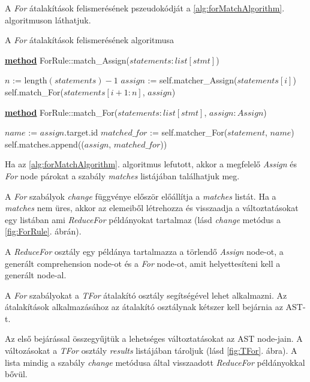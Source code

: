 A \emph{For} átalakítások felismerésének pszeudokódját a
\ref{alg:forMatchAlgorithm}. algoritmuson láthatjuk.

\begin{algorithm}[H]
	\caption{A \emph{For} átalakítások felismerésének algoritmusa}
	\label{alg:forMatchAlgorithm}
	\textbf{\underline{method}} ForRule::match\_Assign($statements: list[stmt]$)
	
	\begin{algorithmic}[1]
	\State $n$ := length$(statements) - 1$
		\State $assign$ := self.matcher\_Assign($statements[i]$)
			\State self.match\_For($statements[i+1:n]$, $assign$)
		\EndIf
	\EndFor
	\end{algorithmic}

	\textbf{\underline{method}} ForRule::match\_For($statements: list[stmt]$, $assign: Assign$)
	\begin{algorithmic}[1]	
	\State $name$ := $assign$.target.id
		\State $matched\_for$ := self.matcher\_For($statement$, $name$)
			\State self.matches.append(($assign$, $matched\_for$))
			\State \Return
		\EndIf
			\State \Return
		\EndIf
	\EndFor
	\end{algorithmic}
\end{algorithm}

Ha az \ref{alg:forMatchAlgorithm}. algoritmus lefutott,
akkor a megfelelő \emph{Assign} és \emph{For} node
párokat a szabály \emph{matches} listájában találhatjuk meg.

A \emph{For} szabályok \emph{change} függvénye először előállítja a \emph{matches} listát.
Ha a \emph{matches} nem üres, akkor az elemeiből létrehozza és visszaadja
a változtatásokat egy listában ami \emph{ReduceFor} példányokat tartalmaz
(lásd \emph{change} metódus a \ref{fig:ForRule}. ábrán).

A \emph{ReduceFor} osztály egy példánya tartalmazza
a törlendő \emph{Assign} node-ot,
a generált comprehension node-ot
és a \emph{For} node-ot, amit helyettesíteni kell a generált node-al.

A \emph{For} szabályokat a \emph{TFor} átalakító osztály segítségével lehet alkalmazni.
Az átalakítások alkalmazásához az átalakító osztálynak kétszer kell bejárnia az AST-t.

Az első bejárással összegyűjtük a lehetséges változtatásokat az AST node-jain.
A változásokat a \emph{TFor} osztály \emph{results} listájában tároljuk
(lásd \ref{fig:TFor}. ábra).
A lista mindig a szabály \emph{change} metódusa által visszaadott
\emph{ReduceFor} példányokkal bővül.


